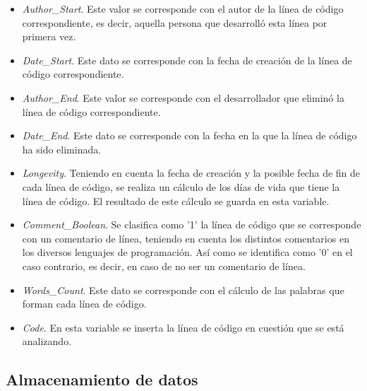 \documentclass[a4paper, 12pt]{book}
\begin{document}
\begin{itemize}
  \item \textit{Author\_Start}. Este valor se corresponde con el autor de la línea de código correspondiente, es decir, aquella persona que desarrolló esta línea por primera vez.
  \item \textit{Date\_Start}. Este dato se corresponde con la fecha de creación de la línea de código correspondiente.
  \item \textit{Author\_End}. Este valor se corresponde con el desarrollador que eliminó la línea de código correspondiente.
  \item \textit{Date\_End}.   Este dato se corresponde con la fecha en la que la línea de código ha sido eliminada.
  \item \textit{Longevity}. Teniendo en cuenta la fecha de creación y la posible fecha de fin de cada línea de código, se realiza un cálculo de los días de vida que tiene la línea de código. El resultado de este cálculo se guarda en esta variable.
  \item \textit{Comment\_Boolean}. Se clasifica como '1' la línea de código que se corresponde con un comentario de línea, teniendo en cuenta los distintos comentarios en los diversos lenguajes de programación. Así como se identifica como '0' en el
  caso contrario, es decir, en caso de no ser un comentario de línea.
  \item \textit{Words\_Count}. Este dato se corresponde con el cálculo de las palabras que forman cada línea de código. 
  \item \textit{Code}. En esta variable se inserta la línea de código en cuestión que se está analizando.
\end{itemize}

\subsection{Almacenamiento de datos}
\label{subsec:almacenamiento}
\end{document}
